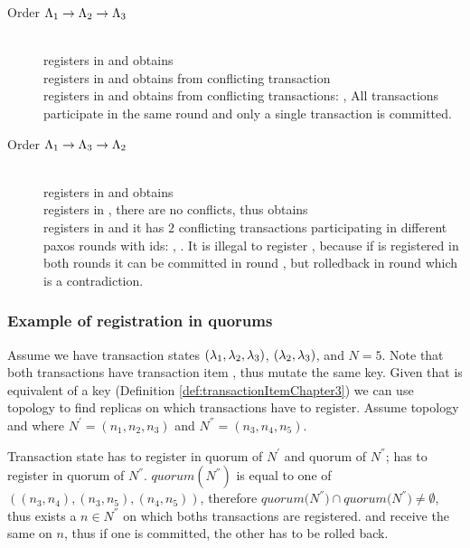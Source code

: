  \begin{description}
 \item[Order $\text{$\Lambda_{1}$} \rightarrow \text{$\Lambda_{2}$} \rightarrow \text{$\Lambda_{3}$}$] \hfill \\
 	 registers in \txIndex and obtains  \\
 	 registers in \txIndex and obtains  from conflicting transaction  \\
 	 registers in \txIndex and obtains  from conflicting transactions: ,  All transactions participate in the same \paxos round and only a single transaction is committed. 
 \item[Order $\text{$\Lambda_{1}$} \rightarrow \text{$\Lambda_{3}$} \rightarrow \text{$\Lambda_{2}$}$] \hfill \\
 	 registers in \txIndex and obtains  \\
 	 registers in \txIndex, there are no conflicts, thus obtains \\
 	 registers in \txIndex and it has $2$ conflicting transactions participating in different paxos rounds with ids: , . It is illegal to register , because if  is registered in both rounds it can be committed in round , but rolledback in round  which is a contradiction.

 \end{description}

\subsubsection{Example of registration in quorums}
Assume we have transaction states
$(\text{$\lambda_{1}$},\text{$\lambda_{2}$}, \text{$\lambda_{3}$})$,
$(\text{$\lambda_{2}$},\text{$\lambda_{3}$})$,  and $N=5$. Note that both transactions have transaction item , thus mutate the same key. Given that \txItem is equivalent of a key (Definition \ref{def:transactionItemChapter3}) we can use topology \topology to find replicas on which transactions have to register. Assume topology  and  where $N^'=(n_1, n_2, n_3)$ and $N^{''}=(n_3,n_4,n_5)$.

Transaction state  has to register in quorum of $N^'$ and quorum of $N^{''}$;  has to register in quorum of $N^{''}$.
$quorum(N^{''})$ is equal to one of $((n_3,n_4),(n_3,n_5),(n_4,n_5))$, therefore $\mathit{quorum(N^{''}}) \cap \mathit{quorum(N^{''}}) \neq \emptyset$, thus exists a $n\in N^{''}$ on which boths transactions are registered.
 and  receive the same \paxosRoundId on $n$, thus if one is committed, the other has to be rolled back.

